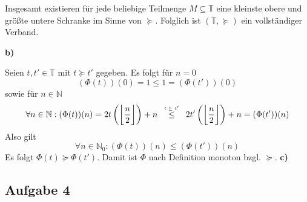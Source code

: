 \documentclass[a4paper,graphics,11pt]{article}
\newcommand{\aufgabe}[1]{\subsection*{Aufgabe #1}}
\newcommand{\up}[2]{\mathrel{\overset{\makebox[0pt]{\mbox{\normalfont\tiny #2}}}{#1}}}
\begin{document}
Insgesamt existieren für jede beliebige Teilmenge $M \subseteq \mathbb{T}$ eine kleinste obere und größte
untere Schranke im Sinne von $\succeq$. Folglich ist $(\mathbb{T}, \succeq)$ ein vollständiger Verband.

\textbf{b)}

Seien $t, t' \in \mathbb{T}$ mit $t \succeq t'$ gegeben. Es folgt für $n = 0$
$$
    (\Phi(t))(0) = 1 \leq 1 = (\Phi(t'))(0)
$$
sowie für $n \in \mathbb{N}$
$$
    \forall n \in \mathbb{N}: (\Phi(t))(n)
    = 2t\left(\bigg\lfloor\frac{n}{2}\bigg\rfloor\right)+n
    \quad\up{\leq}{$t \succeq t'$}\quad
    2t'\left(\bigg\lfloor\frac{n}{2}\bigg\rfloor\right)+n
    = (\Phi(t'))(n)
$$
Also gilt
$$
    \forall n \in \mathbb{N}_0 : (\Phi(t))(n) \leq (\Phi(t'))(n)
$$
Es folgt $\Phi(t) \succeq \Phi(t')$. Damit ist $\Phi$ nach Definition monoton bzgl. $\succeq$.
\newpage
\textbf{c)}
\newpage
\aufgabe{4}
\end{document}
